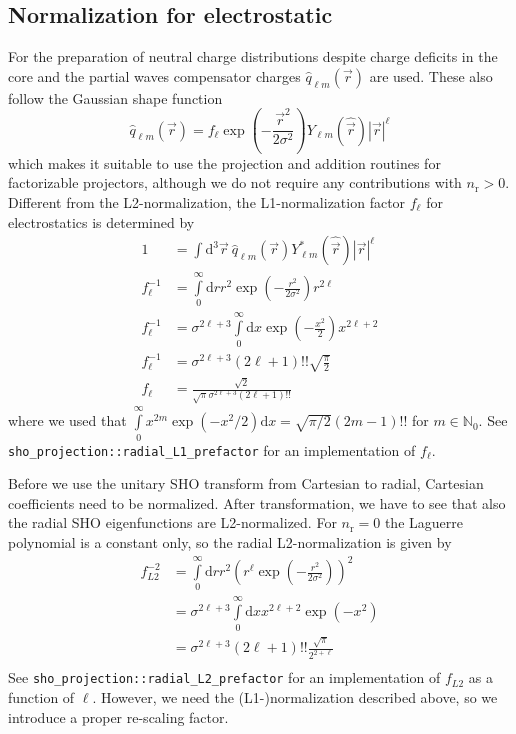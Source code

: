 \documentclass[oribibl]{llncs}
\newcommand{\ttt}[1]{\texttt{#1}}
\newcommand{\nrn}{n_{\mathrm{r}}}
\begin{document}
\subsection{Normalization for electrostatic}
For the preparation of neutral charge distributions despite charge deficits in the core and the partial waves
compensator charges $\hat q_{\ell m}(\vec r)$ are used.
These also follow the Gaussian shape function %
\begin{equation}
 \hat q_{\ell m}(\vec r) = f_{\ell} \exp(-\frac{\vec r^2} {2\sigma^2}) Y_{\ell m}(\hat{\vec r}) |\vec r|^\ell
\end{equation}
which makes it suitable to use the projection and addition routines for factorizable projectors,
although we do not require any contributions with $\nrn > 0$.
Different from the L2-normalization, the L1-normalization factor $f_\ell$ for electrostatics is determined by
\begin{align}
 1 &= \int \mathrm d^3\vec r  \  \hat q_{\ell m}(\vec r) Y^*_{\ell m}(\hat{\vec r}) |\vec r|^\ell \\
 f_\ell^{-1} &= \int\limits_0^\infty \mathrm d r r^2 \exp(-\frac{r^2} {2\sigma^2}) r^{2\ell} \\
 f_\ell^{-1} &= \sigma^{2\ell + 3} \int\limits_0^\infty \mathrm d x \exp(-\frac{x^2}{2}) x^{2\ell + 2} \\
 f_\ell^{-1} &= \sigma^{2\ell + 3} (2\ell + 1)!! \sqrt{\frac{\pi}{2}} \\
 f_\ell &= \frac{\sqrt{2}}{\sqrt{\pi} \sigma^{2\ell + 3} (2\ell + 1)!!}
\end{align}
where we used that $\int\limits_0^{\infty} x^{2m} \exp(-x^2/2) \mathrm dx  = \sqrt{\pi/2} (2m-1)!!$ for $m \in \mathbb N_0$.
See \ttt{sho\_projection::radial\_L1\_prefactor} for an implementation of $f_\ell$.

Before we use the unitary \ac{SHO} transform from Cartesian to radial,
Cartesian coefficients need to be normalized.
After transformation, we have to see that also the radial \ac{SHO} eigenfunctions are L2-normalized.
For $\nrn = 0$ the Laguerre polynomial is a constant only, so
the radial L2-normalization is given by
\begin{align}
	f^{-2}_{L2} &= \int\limits_0^\infty \mathrm dr r^2 \left( r^\ell \exp(-\frac{r^2}{2\sigma^2}) \right)^2 \\
				&= \sigma^{2\ell + 3} \int\limits_0^\infty \mathrm dx x^{2\ell + 2} \exp(-x^2) \\
				&= \sigma^{2\ell + 3} (2\ell + 1)!! \frac{\sqrt{\pi}}{2^{2+\ell}} \\
\end{align}
See \ttt{sho\_projection::radial\_L2\_prefactor} for an implementation of $f_{L2}$ as a function of $\ell$.
However, we need the (L1-)normalization described above, so we introduce a proper re-scaling factor.
\end{document}
